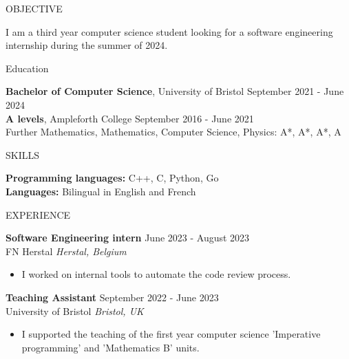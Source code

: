 \documentclass{resume} %
\begin{document}

\begin{rSection}{OBJECTIVE}

{I am a third year computer science student looking for a software engineering internship during the summer of 2024.}


\end{rSection}

\begin{rSection}{Education}

{\bf Bachelor of Computer Science}, University of Bristol \hfill {September 2021 - June 2024} \\

{\bf A levels}, Ampleforth College \hfill {September 2016 - June 2021} \\
Further Mathematics, Mathematics, Computer Science, Physics: A*, A*, A*, A

\end{rSection}

\begin{rSection}{SKILLS}

{\bf Programming languages:} C++, C, Python, Go\\
{\bf Languages:} Bilingual in English and French

\end{rSection}

\begin{rSection}{EXPERIENCE}

\textbf{Software Engineering intern} \hfill June 2023 - August 2023\\
FN Herstal \hfill \textit{Herstal, Belgium}
 \begin{itemize}
    \itemsep -3pt {} 
     \item I worked on internal tools to automate the code review process.
 \end{itemize}

\textbf{Teaching Assistant} \hfill September 2022 - June 2023\\
University of Bristol \hfill \textit{Bristol, UK}
 \begin{itemize}
    \itemsep -3pt {} 
     \item I supported the teaching of the first year computer science 'Imperative programming' and 'Mathematics B' units.
 \end{itemize}
 
\end{rSection} 
\end{document}
